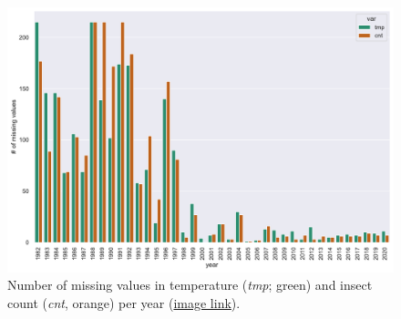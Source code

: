\begin{figure}[H]
	\centering
	\includegraphics[width=0.9\linewidth]{figs/nans_per-year}
	\caption{Number of missing values in temperature (\textit{tmp}; green) and insect count (\textit{cnt}, orange) per year (\href{https://github.com/gtlab-barcelona/Robert/blob/main/data-exploration_first-last/figs/missing-data/nans_per-year.pdf}{image link}).}
	\label{fig:nans-per-year}
\end{figure}